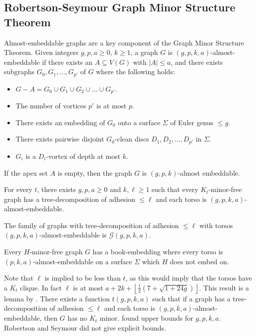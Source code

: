 \subsection{Robertson-Seymour Graph Minor Structure Theorem}\label{ssec:Robertson_Seymour_Graph_Structure}
Almost-embeddable graphs are a key component of the Graph Minor Structure Theorem. Given integers \(g, p, a \geq 0\), \(k \geq 1\), a graph \(G\) is \((g, p, k, a)\)-almost-embeddable if there exists an \(A \subseteq V(G)\) with \(|A| \leq a\), and there exists subgraphs \(G_0, G_1, \ldots,  G_{p'}\) of \(G\) where the following holds:
\begin{itemize}
	\item \(G - A = G_0 \cup G_1 \cup G_2 \cup \ldots \cup G_{p'}\).
	\item The number of vortices $p'$ is at most $p$.
	\item There exists an embedding of \(G_0\) onto a surface \(\Sigma\) of Euler genus \(\leq g\).
	\item There exists pairwise disjoint \(G_0\)-clean discs \(D_1, D_2, \ldots, D_{p'}\) in \(\Sigma\).
	\item \(G_i\) is a \(D_i\)-vortex of depth at most \(k\).
\end{itemize}

 If the apex set $A$ is empty, then the graph $G$ is $(g, p, k)$-almost embeddable. 

\begin{theorem}\label{thm:gmst}
	For every \(t\), there exists \(g, p, a \geq 0\) and \(k, \ell \geq 1\) such that every \(K_t\)-minor-free graph has a tree-decomposition of adhesion \(\leq \ell\) and each torso is \((g, p, k, a)\)-almost-embeddable.
\end{theorem}
The family of graphs with tree-decomposition of adhesion $\leq \ell$ with torsos $(g, p, k, a)$-almost-embeddable is \(\mathcal{G}(g, p, k, a)\). 

\begin{theorem}\label{thm:strong_gmst}
	Every $H$-minor-free graph $G$ has a book-embedding where every torso is $(p, k, a)$-almost-embeddable on a surface $\Sigma$ which $H$ does not embed on.
\end{theorem}

Note that $\ell$ is implied to be less than $t$, as this would imply that the torsos have a $K_t$ clique. In fact $\ell$ is at most $a + 2k + \left\lfloor 
\frac{1}{2} (7 + \sqrt{1 + 24g})
\right\rfloor$. This result is a lemma by \textcite{dujmovicLayeredSeparatorsMinorclosed2017}. 
There exists a function \(t(g, p, k, a)\) such that if a graph has a tree-decomposition of adhesion \(\leq \ell\) and each torso is \((g, p, k, a)\)-almost-embeddable, then \(G\) has no \(K_t\) minor. \textcite{kawarabayashiQuicklyExcludingNonplanar2021} found upper bounds for $g, p, k, a$. Robertson and Seymour did not give explicit bounds.

